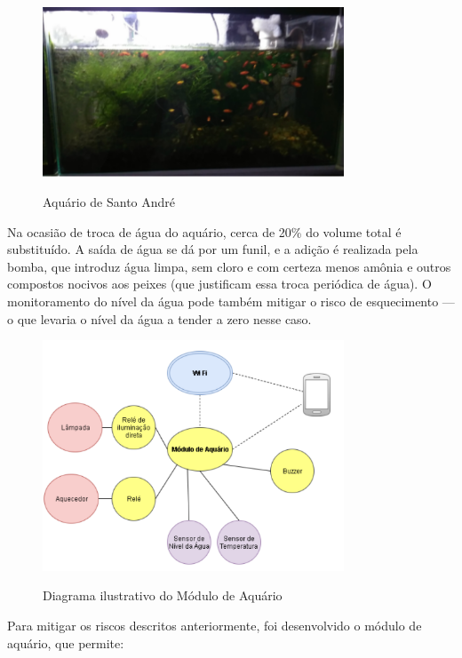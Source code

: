 \begin{figure}[H]
	\centering
	\caption{Aquário de Santo André}
	\includegraphics[width=0.8\textwidth]{aquario}
	\label{fig:aquario}
\end{figure}

Na ocasião de troca de água do aquário, cerca de 20\% do volume total é substituído. A saída de água se dá por um funil, e a adição é realizada pela bomba, que introduz água limpa, sem cloro e com certeza menos amônia e outros compostos nocivos aos peixes (que justificam essa troca periódica de água). O monitoramento do nível da água pode também mitigar o risco de esquecimento --- o que levaria o nível da água a tender a zero nesse caso.

\begin{figure}[H]
	\centering
	\caption{Diagrama ilustrativo do Módulo de Aquário}
	\includegraphics[width=0.8\textwidth]{diagramaAquario}
	\label{fig:diagramaAquario}
\end{figure}

Para mitigar os riscos descritos anteriormente, foi desenvolvido o módulo de aquário, que permite:

